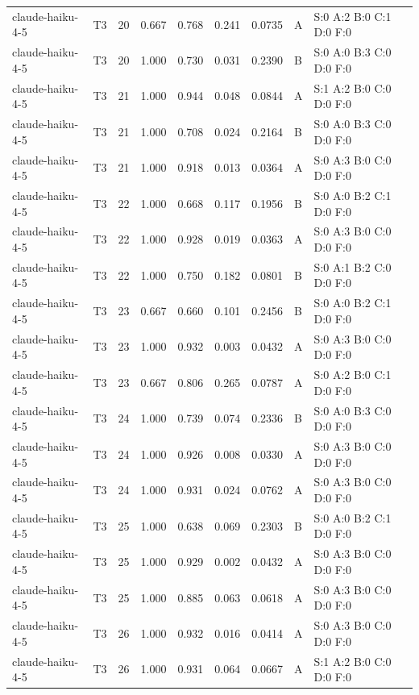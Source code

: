 \begin{longtable}{llrrrrrll}
claude-haiku-4-5 & T3 & 20 & 0.667 & 0.768 & 0.241 & 0.0735 & A & \tiny S:0 A:2 B:0 C:1 D:0 F:0 \\
claude-haiku-4-5 & T3 & 20 & 1.000 & 0.730 & 0.031 & 0.2390 & B & \tiny S:0 A:0 B:3 C:0 D:0 F:0 \\
claude-haiku-4-5 & T3 & 21 & 1.000 & 0.944 & 0.048 & 0.0844 & A & \tiny S:1 A:2 B:0 C:0 D:0 F:0 \\
claude-haiku-4-5 & T3 & 21 & 1.000 & 0.708 & 0.024 & 0.2164 & B & \tiny S:0 A:0 B:3 C:0 D:0 F:0 \\
claude-haiku-4-5 & T3 & 21 & 1.000 & 0.918 & 0.013 & 0.0364 & A & \tiny S:0 A:3 B:0 C:0 D:0 F:0 \\
claude-haiku-4-5 & T3 & 22 & 1.000 & 0.668 & 0.117 & 0.1956 & B & \tiny S:0 A:0 B:2 C:1 D:0 F:0 \\
claude-haiku-4-5 & T3 & 22 & 1.000 & 0.928 & 0.019 & 0.0363 & A & \tiny S:0 A:3 B:0 C:0 D:0 F:0 \\
claude-haiku-4-5 & T3 & 22 & 1.000 & 0.750 & 0.182 & 0.0801 & B & \tiny S:0 A:1 B:2 C:0 D:0 F:0 \\
claude-haiku-4-5 & T3 & 23 & 0.667 & 0.660 & 0.101 & 0.2456 & B & \tiny S:0 A:0 B:2 C:1 D:0 F:0 \\
claude-haiku-4-5 & T3 & 23 & 1.000 & 0.932 & 0.003 & 0.0432 & A & \tiny S:0 A:3 B:0 C:0 D:0 F:0 \\
claude-haiku-4-5 & T3 & 23 & 0.667 & 0.806 & 0.265 & 0.0787 & A & \tiny S:0 A:2 B:0 C:1 D:0 F:0 \\
claude-haiku-4-5 & T3 & 24 & 1.000 & 0.739 & 0.074 & 0.2336 & B & \tiny S:0 A:0 B:3 C:0 D:0 F:0 \\
claude-haiku-4-5 & T3 & 24 & 1.000 & 0.926 & 0.008 & 0.0330 & A & \tiny S:0 A:3 B:0 C:0 D:0 F:0 \\
claude-haiku-4-5 & T3 & 24 & 1.000 & 0.931 & 0.024 & 0.0762 & A & \tiny S:0 A:3 B:0 C:0 D:0 F:0 \\
claude-haiku-4-5 & T3 & 25 & 1.000 & 0.638 & 0.069 & 0.2303 & B & \tiny S:0 A:0 B:2 C:1 D:0 F:0 \\
claude-haiku-4-5 & T3 & 25 & 1.000 & 0.929 & 0.002 & 0.0432 & A & \tiny S:0 A:3 B:0 C:0 D:0 F:0 \\
claude-haiku-4-5 & T3 & 25 & 1.000 & 0.885 & 0.063 & 0.0618 & A & \tiny S:0 A:3 B:0 C:0 D:0 F:0 \\
claude-haiku-4-5 & T3 & 26 & 1.000 & 0.932 & 0.016 & 0.0414 & A & \tiny S:0 A:3 B:0 C:0 D:0 F:0 \\
claude-haiku-4-5 & T3 & 26 & 1.000 & 0.931 & 0.064 & 0.0667 & A & \tiny S:1 A:2 B:0 C:0 D:0 F:0 \\

\end{longtable}
